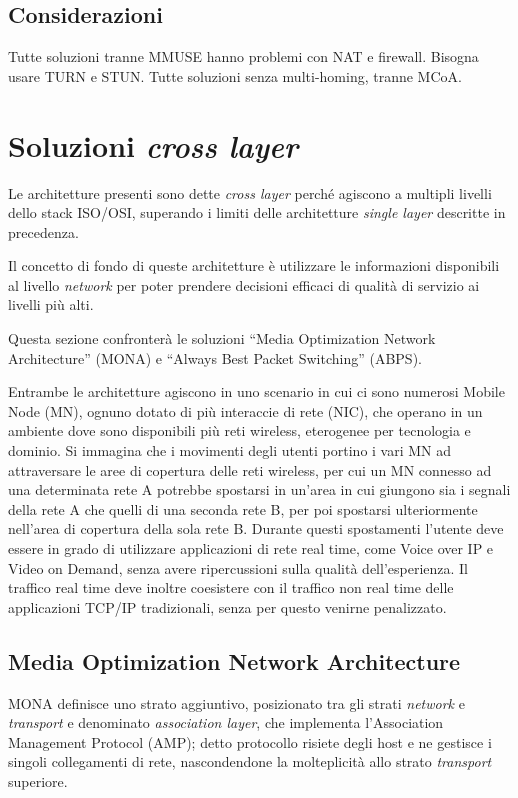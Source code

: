 \documentclass[12pt,a4paper,openright,twoside]{book}
\begin{document}
\subsection{Considerazioni}
Tutte soluzioni tranne MMUSE hanno problemi con NAT e
firewall. Bisogna usare TURN e STUN. Tutte soluzioni senza
multi-homing, tranne MCoA.


\section{Soluzioni \emph{cross layer}}
Le architetture presenti sono dette \emph{cross layer} perché agiscono
a multipli livelli dello stack ISO/OSI, superando i limiti delle
architetture \emph{single layer} descritte in precedenza.

Il concetto di fondo di queste architetture è utilizzare le
informazioni disponibili al livello \emph{network} per poter prendere
decisioni efficaci di qualità di servizio ai livelli più alti.

Questa sezione confronterà le soluzioni ``Media Optimization Network
Architecture'' (MONA) e ``Always Best Packet Switching'' (ABPS).

Entrambe le architetture agiscono in uno scenario in cui ci sono
numerosi Mobile Node (MN), ognuno dotato di più interaccie di rete
(NIC), che operano in un ambiente dove sono disponibili più reti
wireless, eterogenee per tecnologia e dominio. Si immagina che i
movimenti degli utenti portino i vari MN ad attraversare le aree di
copertura delle reti wireless, per cui un MN connesso ad una
determinata rete A potrebbe spostarsi in un'area in cui giungono sia i
segnali della rete A che quelli di una seconda rete B, per poi
spostarsi ulteriormente nell'area di copertura della sola rete
B. Durante questi spostamenti l'utente deve essere in grado di
utilizzare applicazioni di rete real time, come Voice over IP e Video
on Demand, senza avere ripercussioni sulla qualità dell'esperienza. Il
traffico real time deve inoltre coesistere con il traffico non real
time delle applicazioni TCP/IP tradizionali, senza per questo venirne
penalizzato.

\subsection{Media Optimization Network Architecture}

MONA definisce uno strato aggiuntivo, posizionato tra gli strati
\emph{network} e \emph{transport} e denominato \emph{association
  layer}, che implementa l'Association Management Protocol (AMP);
detto protocollo risiete degli host e ne gestisce i singoli
collegamenti di rete, nascondendone la molteplicità allo strato
\emph{transport} superiore.
\end{document}
